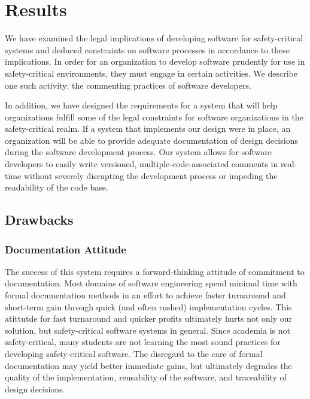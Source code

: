 \section{Results}\label{results}
We have examined the legal implications of developing software for
safety-critical systems and deduced constraints on software processes in
accordance to these implications. In order for an organization to develop 
software prudently for use in safety-critical environments, they must engage in
certain activities. We describe one such activity: the commenting practices of
software developers.

In addition, we have designed the requirements for a system that will help
organizations fulfill some of the legal constraints for software organizations
in the safety-critical realm. If a system that implements our design were in
place, an organization will be able to provide adequate documentation of design
decisions during the software development process. Our system allows for 
software developers to easily write versioned, multiple-code-associated comments
in real-time without severely disrupting the  development process or impeding
the readability of the code base.

\subsection{Drawbacks}

\subsubsection*{Documentation Attitude}
The success of this system requires a forward-thinking attitude of commitment to
documentation. Most domains of software engineering spend minimal time with
formal documentation methods in an effort to achieve faster turnaround and
short-term gain through quick (and often rushed) implementation cycles. This
atittutde for fast turnaround and quicker profits ultimately hurts not only our
solution, but safety-critical software systems in general. Since academia is not
safety-critical, many students are not learning the most sound practices for
developing safety-critical software. The disregard to the care of formal
documentation may yield better immediate gains, but ultimately degrades the
quality of the implementation, reusability of the software,  and traceability of
design decisions.

